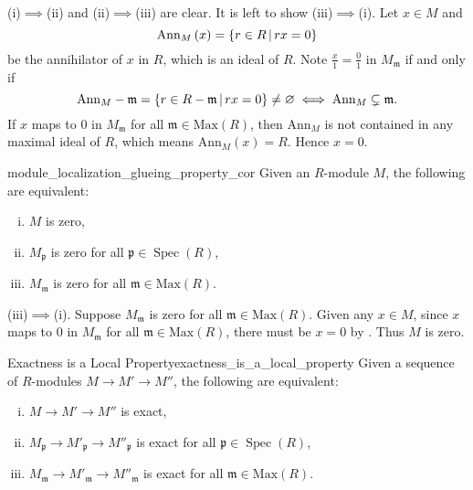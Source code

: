 \begin{prf}
    (i)$\implies$(ii) and (ii)$\implies$(iii) are clear. It is left to show (iii)$\implies$(i). Let $x\in M$ and 
    \[
        \mathrm{Ann}_M\left(x\right)=\left\{r\in R\,\middle\vert\, rx=0\right\} 
    \] 
    be the annihilator of $x$ in $R$, which is an ideal of $R$. Note $\frac{x}{1}=\frac{0}{1}$ in $M_{\mathfrak{m}}$ if and only if 
    \[
        \mathrm{Ann}_M -\mathfrak{m}=\left\{r\in R-\mathfrak{m}\,\middle\vert\, rx=0\right\}\neq \varnothing\iff \mathrm{Ann}_M \subsetneq \mathfrak{m}.
    \]
    If $x$ maps to $0$ in $M_{\mathfrak{m}}$ for all $\mathfrak{m}\in \mathrm{Max}\left(R\right)$, then $\mathrm{Ann}_M$ is not contained in any maximal ideal of $R$, which means $\mathrm{Ann}_M(x)=R$. Hence $x=0$.
\end{prf}

\begin{corollary}{}{module_localization_glueing_property_cor}
    Given an $R$-module $M$, the following are equivalent:
    \begin{enumerate}[(i)]
        \item $M$ is zero,
        \item $M_{\mathfrak{p}}$ is zero for all $\mathfrak{p} \in \operatorname{Spec}(R)$,
        \item $M_{\mathfrak{m}}$ is zero for all $\mathfrak{m}\in \mathrm{Max}\left(R\right)$.
    \end{enumerate} 
\end{corollary}

\begin{prf}
    (iii)$\implies$(i). Suppose $M_{\mathfrak{m}}$ is zero for all $\mathfrak{m}\in \mathrm{Max}\left(R\right)$. Given any $x\in M$, since $x$ maps to $0$ in $M_{\mathfrak{m}}$ for all $\mathfrak{m}\in \mathrm{Max}\left(R\right)$, there must be $x=0$ by . Thus $M$ is zero.\\
\end{prf}

\begin{corollary}{Exactness is a Local Property}{exactness_is_a_local_property}
    Given a sequence of $R$-modules $M\to M'\to M''$, the following are equivalent:
    \begin{enumerate}[(i)]
        \item $M\to M'\to M''$ is exact,
        \item $M_{\mathfrak{p}}\to M'_{\mathfrak{p}}\to M''_{\mathfrak{p}}$ is exact for all $\mathfrak{p} \in \operatorname{Spec}(R)$,
        \item $M_{\mathfrak{m}}\to M'_{\mathfrak{m}}\to M''_{\mathfrak{m}}$ is exact for all $\mathfrak{m}\in \mathrm{Max}\left(R\right)$.
    \end{enumerate}
\end{corollary}

